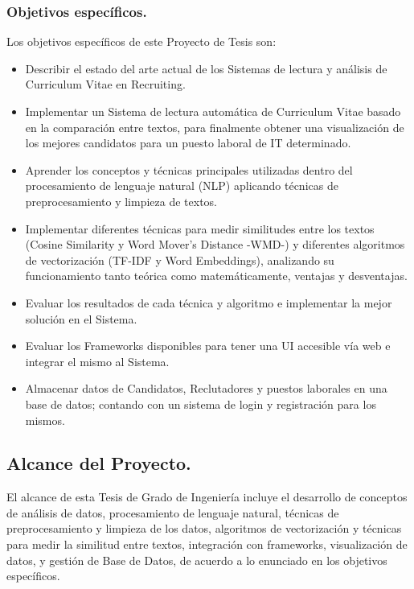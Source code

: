 \documentclass[12pt,a4paper]{article}
\begin{document}
\subsubsection{Objetivos específicos.}
Los objetivos específicos de este Proyecto de Tesis son:
\begin{itemize}
\item Describir el estado del arte actual de los Sistemas de lectura y análisis de Curriculum Vitae en Recruiting. 
\item Implementar un Sistema de lectura automática de Curriculum Vitae basado en la comparación entre textos, para finalmente obtener una visualización de los mejores candidatos para un puesto laboral de IT determinado.  
\item Aprender los conceptos y técnicas principales utilizadas dentro del procesamiento de lenguaje natural (NLP) aplicando técnicas de preprocesamiento y limpieza de textos.
\item Implementar diferentes técnicas para medir similitudes entre los textos (Cosine Similarity y  Word Mover's Distance -WMD-) y diferentes algoritmos de vectorización (TF-IDF y Word Embeddings), analizando su funcionamiento tanto teórica como matemáticamente, ventajas y desventajas.
\item Evaluar los resultados de cada técnica y algoritmo e implementar la mejor solución en el Sistema.
\item Evaluar los Frameworks disponibles para tener una UI accesible vía web e integrar el mismo al Sistema.
\item Almacenar datos de Candidatos, Reclutadores y puestos laborales en una base de datos; contando con un sistema de login y registración para los mismos.
\end{itemize} 

\cleardoublepage    %

\subsection{Alcance del Proyecto.}
El alcance de esta Tesis de Grado de Ingeniería incluye el desarrollo de conceptos de análisis de datos, procesamiento de lenguaje natural, técnicas de preprocesamiento y limpieza de los datos, algoritmos de vectorización y técnicas para medir la similitud entre textos, integración con frameworks, visualización de datos, y gestión de Base de Datos, de acuerdo a lo enunciado en los objetivos específicos.
\end{document}
